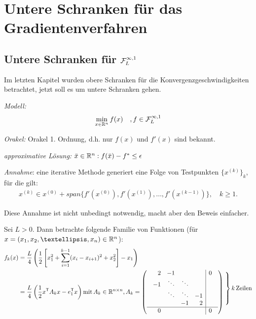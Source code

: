 \chapter{Untere Schranken für das Gradientenverfahren}

\section{Untere Schranken für $\mathcal{F}_L^{\infty, 1}$}

Im letzten Kapitel wurden obere Schranken für die Konvergenzgeschwindigkeiten betrachtet, jetzt soll es um untere Schranken gehen.

\textit{Modell:}
\begin{align*}
\min_{x \in \mathbb R^n} f(x) \quad , f \in \mathcal{F}^{\infty,1}_L
\end{align*}

\textit{Orakel:} Orakel 1. Ordnung, d.h. nur $f(x)$ und $f'(x)$ sind bekannt.

\textit{approximative Lösung:} $\bar{x} \in \mathbb R^n : f(\bar{x}) - f^* \leq \epsilon$

\noindent
\textit{Annahme}: eine iterative Methode generiert eine Folge von Testpunkten $\{x^{(k)}\}_k$, für die gilt:
\begin{align*}
x^{(k)} \in x^{(0)} + span\{f'(x^{(0)}), f'(x^{(1)}), …, f'(x^{(k-1)})\}, \quad k \geq 1.
\end{align*}

\begin{Bemerkung}
Diese Annahme ist nicht unbedingt notwendig, macht aber den Beweis einfacher.
\end{Bemerkung}

Sei $L>0$. Dann betrachte folgende Familie von Funktionen (für $x = (x_1,x_2,…,x_n)\in\R^n$):
\begin{align*}
f_k(x) &= \frac{L}{4} \left( \frac{1}{2} \left[ x_1^2 + \sum_{i=1}^{k-1}(x_i-x_{i+1})^2 + x_2^2 \right] - x_1\right)\\
       &= \frac{L}{4} \left( \frac{1}{2} x\tr A_k x - e_1\tr x \right)
\text{mit}\,A_k \in \R^{n \times n}, A_k =
\left(
\begin{array}{c}
\begin{array}{rrrr|c}
2  & -1     &        &    & 0\\
-1 & \ddots & \ddots &    & \\
   & \ddots & \ddots & -1 & \\
   &        &   -1   & 2  & \\
\end{array}\\
\hline
\begin{array}{rrrr|c}
\phantom{-}0  & \phantom{-1}  & \phantom{-1} & \phantom{-1} & 0 \\
\end{array}
\end{array}
\right)\raisebox{0.5\normalbaselineskip}{%
$\left.\rule{0pt}{2.5\normalbaselineskip}\right\}k\,\text{Zeilen}$}
\end{align*}

